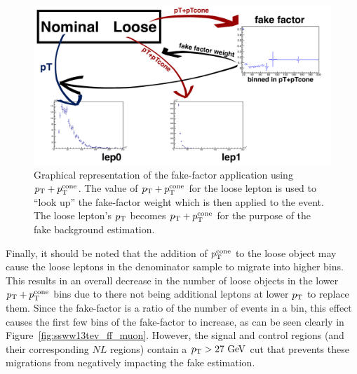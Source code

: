 \begin{figure}[htbp]
  \centering
  \includegraphics[width=.95\textwidth]{figs/ssww_13tev/backgrounds/ff/apply_ff}
  \caption{Graphical representation of the fake-factor application using $p_{\mathrm{T}}+p_{\mathrm{T}}^{\textrm{cone}}$.  The value of $p_{\mathrm{T}}+p_{\mathrm{T}}^{\textrm{cone}}$ for the loose lepton is used to ``look up'' the fake-factor weight which is then applied to the event.  The loose lepton's $p_{\mathrm{T}}$ becomes $p_{\mathrm{T}}+p_{\mathrm{T}}^{\textrm{cone}}$ for the purpose of the fake background estimation.}
  \label{fig:ssww13tev_ff_application}
\end{figure}

Finally, it should be noted that the addition of $p_{\mathrm{T}}^{\textrm{cone}}$ to the loose object may cause the loose leptons in the denominator sample to migrate into higher bins.
This results in an overall decrease in the number of loose objects in the lower $p_{\mathrm{T}}+p_{\mathrm{T}}^{\textrm{cone}}$ bins due to there not being additional leptons at lower $p_{\mathrm{T}}$ to replace them.
Since the fake-factor is a ratio of the number of events in a bin, this effect causes the first few bins of the fake-factor to increase, as can be seen clearly in Figure~\ref{fig:ssww13tev_ff_muon}.
However, the signal and control regions (and their corresponding $NL$ regions) contain a $\pt > 27\gev$ cut that prevents these migrations from negatively impacting the fake estimation.

%
